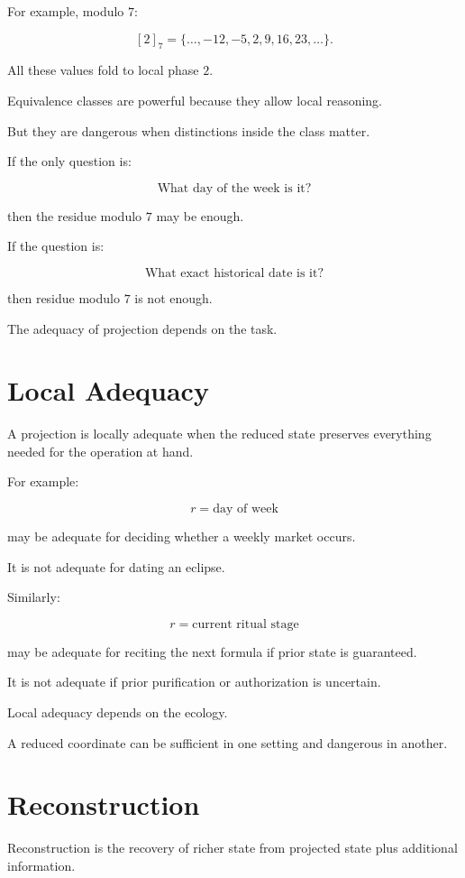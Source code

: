\documentclass[11pt]{book}
\begin{document}
For example, modulo \(7\):

\[
[2]_7 = \{\ldots,-12,-5,2,9,16,23,\ldots\}.
\]

All these values fold to local phase \(2\).

Equivalence classes are powerful because they allow local reasoning.

But they are dangerous when distinctions inside the class matter.

If the only question is:

\[
\text{What day of the week is it?}
\]

then the residue modulo \(7\) may be enough.

If the question is:

\[
\text{What exact historical date is it?}
\]

then residue modulo \(7\) is not enough.

The adequacy of projection depends on the task.

\section{Local Adequacy}

A projection is locally adequate when the reduced state preserves everything needed for the operation at hand.

For example:

\[
r = \text{day of week}
\]

may be adequate for deciding whether a weekly market occurs.

It is not adequate for dating an eclipse.

Similarly:

\[
r = \text{current ritual stage}
\]

may be adequate for reciting the next formula if prior state is guaranteed.

It is not adequate if prior purification or authorization is uncertain.

Local adequacy depends on the ecology.

A reduced coordinate can be sufficient in one setting and dangerous in another.

\section{Reconstruction}

Reconstruction is the recovery of richer state from projected state plus additional information.
\end{document}
